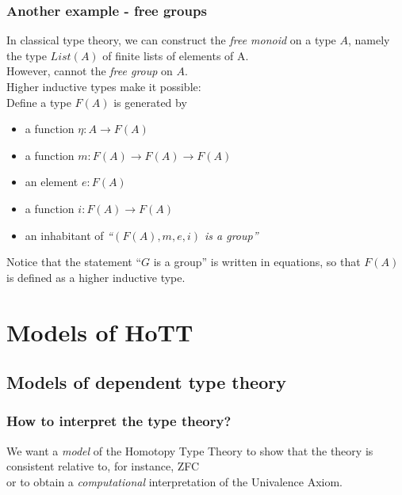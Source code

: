 \documentclass[dvipdfmx]{beamer}
\begin{document}
\begin{frame}
  \frametitle{Another example - free groups}
  In classical type theory,
  we can construct the {\it free monoid} on a type $A$,
  namely the type $List \left( A \right)$ of finite lists
  of elements of A.
  \\
  However, cannot the {\it free group} on $A$.
  \\
  Higher inductive types make it possible:
  \\
  Define a type $F \left( A \right)$ is generated by
  \begin{itemize}
    \item a function $\eta : A \to F \left( A \right)$
    \item a function $m : F \left( A \right) \to
      F \left( A \right) \to F \left( A \right)$
    \item an element $e : F \left( A \right)$
    \item a function $i : F \left( A \right) \to F \left( A \right)$
    \item an inhabitant of
      {\it ``$\left( F \left( A \right) , m , e , i \right)$ is a group''}
  \end{itemize}
  Notice that the statement ``$G$ is a group''
  is written in equations, so that
  $F \left( A \right)$ is defined as a higher inductive type.
\end{frame}

\section{Models of HoTT}

\subsection{Models of dependent type theory}

\begin{frame}
  \frametitle{How to interpret the type theory?}
  We want a {\it model} of the Homotopy Type Theory
  to show that the theory is consistent relative to,
  for instance, ZFC
  \\
  or
  to obtain a {\it computational} interpretation of
  the Univalence Axiom.\nocite{bezem_et_all:LIPIcs:20144628}
\end{frame}
\end{document}
